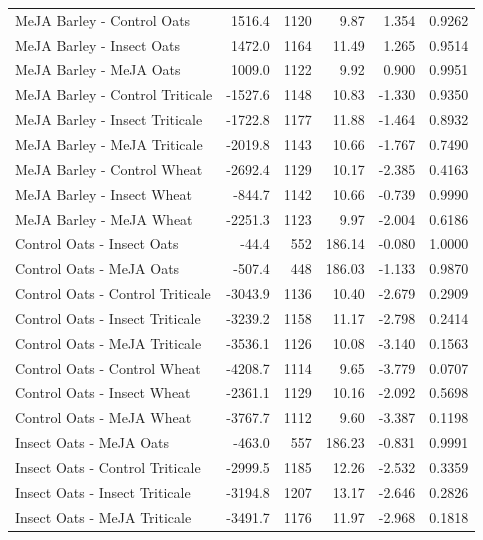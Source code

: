 \documentclass[12pt, letterpaper, ]{report}
\begin{document}
\begin{center}
\begin{longtable}{lrrrrr}
            MeJA Barley - Control Oats & 1516.4 &1120 & 9.87 & 1.354 & 0.9262 \\
            MeJA Barley - Insect Oats & 1472.0 &1164 & 11.49 & 1.265 & 0.9514 \\
            MeJA Barley - MeJA Oats & 1009.0 &1122 & 9.92 & 0.900 & 0.9951 \\
            MeJA Barley - Control Triticale &-1527.6 &1148 & 10.83 & -1.330 & 0.9350 \\
            MeJA Barley - Insect Triticale &-1722.8 &1177 & 11.88 & -1.464 & 0.8932 \\
            MeJA Barley - MeJA Triticale &-2019.8 &1143 & 10.66 & -1.767 & 0.7490 \\
            MeJA Barley - Control Wheat &-2692.4 &1129 & 10.17 & -2.385 & 0.4163 \\
            MeJA Barley - Insect Wheat & -844.7 &1142 & 10.66 & -0.739 & 0.9990 \\
            MeJA Barley - MeJA Wheat &-2251.3 &1123 & 9.97 & -2.004 & 0.6186 \\
            Control Oats - Insect Oats & -44.4 & 552 & 186.14 & -0.080 & 1.0000 \\
            Control Oats - MeJA Oats & -507.4 & 448 & 186.03 & -1.133 & 0.9870 \\
            Control Oats - Control Triticale &-3043.9 &1136 & 10.40 & -2.679 & 0.2909 \\
            Control Oats - Insect Triticale &-3239.2 &1158 & 11.17 & -2.798 & 0.2414 \\
            Control Oats - MeJA Triticale &-3536.1 &1126 & 10.08 & -3.140 & 0.1563 \\
            Control Oats - Control Wheat &-4208.7 &1114 & 9.65 & -3.779 & 0.0707 \\
            Control Oats - Insect Wheat &-2361.1 &1129 & 10.16 & -2.092 & 0.5698 \\
            Control Oats - MeJA Wheat &-3767.7 &1112 & 9.60 & -3.387 & 0.1198 \\
            Insect Oats - MeJA Oats & -463.0 & 557 & 186.23 & -0.831 & 0.9991 \\
            Insect Oats - Control Triticale &-2999.5 &1185 & 12.26 & -2.532 & 0.3359 \\
            Insect Oats - Insect Triticale &-3194.8 &1207 & 13.17 & -2.646 & 0.2826 \\
            Insect Oats - MeJA Triticale &-3491.7 &1176 & 11.97 & -2.968 & 0.1818 \\

\end{longtable}
\end{center}
\end{document}
